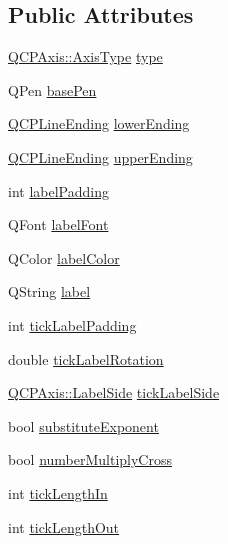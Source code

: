 \subsection*{Public Attributes}
\begin{DoxyCompactItemize}
\item 
\hyperlink{classQCPAxis_ae2bcc1728b382f10f064612b368bc18a}{Q\+C\+P\+Axis\+::\+Axis\+Type} \hyperlink{classQCPAxisPainterPrivate_ae04594e97417336933d807c86d353098}{type}
\item 
Q\+Pen \hyperlink{classQCPAxisPainterPrivate_ab4affb27ae3485fecb7466622cabcbb2}{base\+Pen}
\item 
\hyperlink{classQCPLineEnding}{Q\+C\+P\+Line\+Ending} \hyperlink{classQCPAxisPainterPrivate_a077696dd1e7efb96e4c199f521433e24}{lower\+Ending}
\item 
\hyperlink{classQCPLineEnding}{Q\+C\+P\+Line\+Ending} \hyperlink{classQCPAxisPainterPrivate_af764be913be5f924700ac9bbb8c01139}{upper\+Ending}
\item 
int \hyperlink{classQCPAxisPainterPrivate_a3f7465372df132bf7814345ea697dd34}{label\+Padding}
\item 
Q\+Font \hyperlink{classQCPAxisPainterPrivate_add1ff1030fbc36112c19b1468ad82d55}{label\+Font}
\item 
Q\+Color \hyperlink{classQCPAxisPainterPrivate_a5c36467daf057da0cf0792f3c5a06089}{label\+Color}
\item 
Q\+String \hyperlink{classQCPAxisPainterPrivate_afe004c322f92543c0467afc02da6cf6d}{label}
\item 
int \hyperlink{classQCPAxisPainterPrivate_a264cfa080e84e536cf2d1ab9c5d5cc5f}{tick\+Label\+Padding}
\item 
double \hyperlink{classQCPAxisPainterPrivate_ae6ade9232a8e400924009e8edca94bac}{tick\+Label\+Rotation}
\item 
\hyperlink{classQCPAxis_a24b13374b9b8f75f47eed2ea78c37db9}{Q\+C\+P\+Axis\+::\+Label\+Side} \hyperlink{classQCPAxisPainterPrivate_a9d27f7625fcfbeb3a60193d0c18fc7e9}{tick\+Label\+Side}
\item 
bool \hyperlink{classQCPAxisPainterPrivate_a546d22b10ddb5ca8582b7deb90223a91}{substitute\+Exponent}
\item 
bool \hyperlink{classQCPAxisPainterPrivate_a0deb7524009140f00a774dfd286d002c}{number\+Multiply\+Cross}
\item 
int \hyperlink{classQCPAxisPainterPrivate_ae7360ff805fc6097019de8b35ffbd7e7}{tick\+Length\+In}
\item 
int \hyperlink{classQCPAxisPainterPrivate_acbebb1f868906200f968627bc907b77d}{tick\+Length\+Out}

\end{DoxyCompactItemize}
